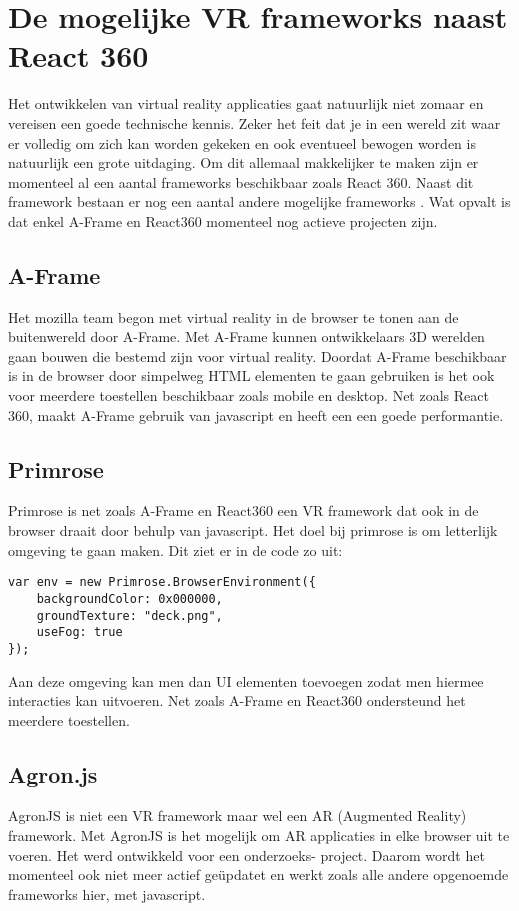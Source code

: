 \section{De mogelijke VR frameworks naast React 360}
\label{sec:frameworks-alternatieven}
Het ontwikkelen van virtual reality applicaties gaat natuurlijk niet zomaar en vereisen een goede technische kennis. Zeker het feit dat je in een wereld zit waar er volledig om zich kan worden gekeken en ook eventueel bewogen worden is natuurlijk een grote uitdaging. Om dit allemaal makkelijker te maken zijn er momenteel al een aantal frameworks beschikbaar zoals React 360. Naast dit framework bestaan er nog een aantal andere mogelijke frameworks \autocite{UIUXLab2017}. Wat opvalt is dat enkel A-Frame en React360 momenteel nog actieve projecten zijn. 

\subsection{A-Frame}
\label{subsec:a-frame}
Het mozilla team begon met virtual reality in de browser te tonen aan de buitenwereld door A-Frame. Met A-Frame kunnen ontwikkelaars 3D werelden gaan bouwen die bestemd zijn voor virtual reality. Doordat A-Frame beschikbaar is in de browser door simpelweg HTML elementen te gaan gebruiken is het ook voor meerdere toestellen beschikbaar zoals mobile en desktop. Net zoals React 360, maakt A-Frame gebruik van javascript en heeft een een goede performantie.
 
\subsection{Primrose}
\label{subsec:primrose}
Primrose is net zoals A-Frame en React360 een VR framework dat ook in de browser draait door behulp van javascript. Het doel bij primrose is om letterlijk omgeving te gaan maken. Dit ziet er in de code zo uit:

\begin{lstlisting}[frame=single, caption=Voorbeeld van primrose omgeving]
var env = new Primrose.BrowserEnvironment({
	backgroundColor: 0x000000,
	groundTexture: "deck.png",
	useFog: true
});
\end{lstlisting}

Aan deze omgeving kan men dan UI elementen toevoegen zodat men hiermee interacties kan uitvoeren. Net zoals A-Frame en React360 ondersteund het meerdere toestellen.

\subsection{Agron.js}
\label{subsec:agron.js}
AgronJS is niet een VR framework maar wel een AR (Augmented Reality) framework. Met AgronJS is het mogelijk om AR applicaties in elke browser uit te voeren. Het werd ontwikkeld voor een onderzoeks- project. Daarom wordt het momenteel ook niet meer actief geüpdatet en werkt zoals alle andere opgenoemde frameworks hier, met javascript.




